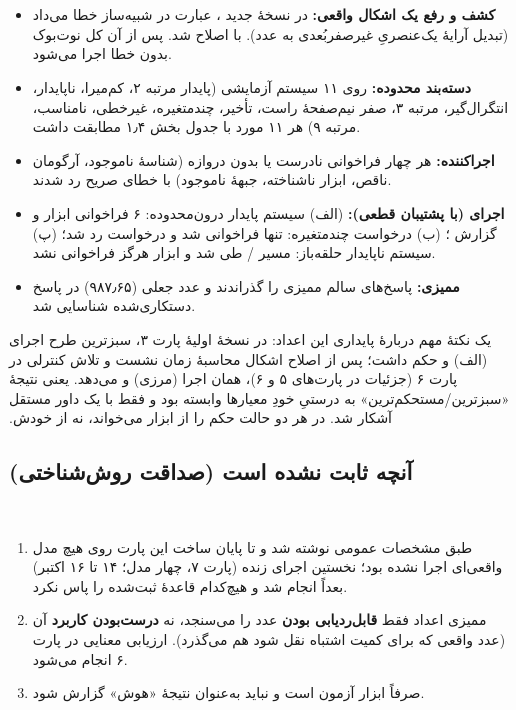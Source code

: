 ‫\documentclass[a4paper,12pt]{article}
\begin{document}
‫\begin{itemize}
‫\item \textbf{کشف و رفع یک اشکال واقعی:} در نسخهٔ جدید ، عبارت \texttt{} در شبیه‌ساز  خطا می‌داد (تبدیل آرایهٔ یک‌عنصریِ غیرصفربُعدی به عدد). با \texttt{} اصلاح شد. پس از آن کل نوت‌بوک بدون خطا اجرا می‌شود.
‫\item \textbf{دسته‌بند محدوده:} روی ۱۱ سیستم آزمایشی (پایدار مرتبه ۲، کم‌میرا، ناپایدار، انتگرال‌گیر، مرتبه ۳، صفر نیم‌صفحهٔ راست، تأخیر، چندمتغیره، غیرخطی، نامناسب، مرتبه ۹) هر ۱۱ مورد با جدول بخش ۱٫۴ مطابقت داشت.
‫\item \textbf{اجراکننده:} هر چهار فراخوانی نادرست یا بدون دروازه (شناسهٔ ناموجود، آرگومان ناقص، ابزار ناشناخته، جبههٔ ناموجود) با خطای صریح رد شدند.
‫\item \textbf{اجرای  (با پشتیبان قطعی):} (الف) سیستم پایدار درون‌محدوده: ۶ فراخوانی ابزار و گزارش ؛ (ب) درخواست چندمتغیره: تنها \texttt{} فراخوانی شد و درخواست رد شد؛ (پ) سیستم ناپایدار حلقه‌باز: مسیر / طی شد و ابزار  هرگز فراخوانی نشد.
‫\item \textbf{ممیزی:} پاسخ‌های سالم ممیزی را گذراندند و عدد جعلی (۹۸۷٫۶۵) در پاسخ دستکاری‌شده شناسایی شد.
‫\end{itemize}
‫یک نکتهٔ مهم دربارهٔ پایداری این اعداد: در نسخهٔ اولیهٔ پارت ۳، سبزترین طرح اجرای (الف)  و حکم  داشت؛ پس از اصلاح اشکال محاسبهٔ زمان نشست و تلاش کنترلی در پارت ۶ (جزئیات در پارت‌های ۵ و ۶)، همان اجرا  (مرزی) و  می‌دهد. یعنی نتیجهٔ «سبزترین/مستحکم‌ترین» به درستیِ خودِ معیارها وابسته بود و فقط با یک داور مستقل آشکار شد.  در هر دو حالت حکم را از ابزار می‌خواند، نه از خودش.
‫
‫\subsection{آنچه ثابت نشده است (صداقت روش‌شناختی)}
‫\begin{enumerate}
‫\item {} طبق مشخصات عمومی  نوشته شد و تا پایان ساخت این پارت روی هیچ مدل واقعی‌ای اجرا نشده بود؛ نخستین اجرای زنده (پارت ۷، چهار مدل؛ ۱۴ تا ۱۶ اکتبر) بعداً انجام شد و هیچ‌کدام قاعدهٔ ثبت‌شده را پاس نکرد.
‫\item ممیزی اعداد فقط \textbf{قابل‌ردیابی بودن} عدد را می‌سنجد، نه \textbf{درست‌بودن کاربرد} آن (عدد واقعی که برای کمیت اشتباه نقل شود هم می‌گذرد). ارزیابی معنایی در پارت ۶ انجام می‌شود.
‫\item {} صرفاً ابزار آزمون است و نباید به‌عنوان نتیجهٔ «هوش»  گزارش شود.
‫\end{enumerate}
\end{document}
